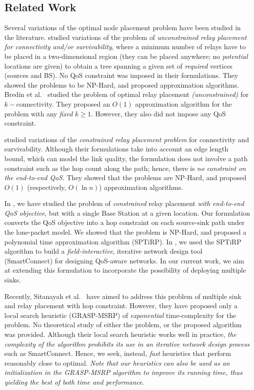 \documentclass[conference]{IEEEtran}
\begin{document}
\subsection{Related Work}
Several variations of the optimal node placement problem have been studied in the literature. \cite{Lin,cheng,Lloyd} studied variations of the problem of \emph{unconstrained relay placement for connectivity and/or survivability}, where a minimum number of relays have to be placed in a two-dimensional region (they can be placed anywhere; no \emph{potential} locations are given) to obtain a tree spanning a given set of \emph{required} vertices (sources and BS). No QoS constraint was imposed in their formulations. They showed the problems to be NP-Hard, and proposed approximation algorithms. Bredin et al.\ \cite{bredin} studied the problem of optimal relay placement \emph{(unconstrained)} for $k-$connectivity. They proposed an $O(1)$ approximation algorithm for the problem with any \emph{fixed} $k\geq 1$. However, they also did not impose any QoS constraint. 

\cite{Misra,yang} studied variations of the \emph{constrained relay placement problem} for connectivity and survivability. Although their formulations take into account an edge length bound, which can model the link quality, the formulation does not involve a path constraint such as the hop count along the path; hence, there is \emph{no constraint on the end-to-end QoS.} They showed that the problems are NP-Hard, and proposed $O(1)$ (respectively, $O(\ln n)$) approximation algorithms. 

In \cite{iwqos,fullpaper}, we have studied the problem of \emph{constrained} relay placement \emph{with end-to-end QoS objective}, but with a single Base Station at a given location. Our formulation converts the QoS objective into a hop constraint on each source-sink path under the lone-packet model. We showed that the problem is NP-Hard, and proposed a polynomial time approximation algorithm (SPTiRP). In \cite{smartconnect-paper}, we used the SPTiRP algorithm to build a  \emph{field-interactive}, iterative network design tool (SmartConnect) for designing QoS-aware networks. In our current work, we aim at extending this formulation to incorporate the possibility of deploying multiple sinks. 
  
Recently, Sitanayah et al.\ \cite{sitanayah} have aimed to address this problem of multiple sink and relay placement with hop constraint. However, they have proposed only a local search heuristic (GRASP-MSRP) of \emph{exponential} time-complexity for the problem. No theoretical study of either the problem, or the proposed algorithm was provided. Although their local search heuristic works well in practice, \emph{the complexity of the algorithm prohibits its use in an iterative network design process} such as SmartConnect\cite{smartconnect-paper}. Hence, we seek, instead, \emph{fast} heuristics that perform reasonably close to optimal. \emph{Note that our heuristics can also be used as an initialization in the GRASP-MSRP algorithm \cite{sitanayah} to improve its running time, thus yielding the best of both time and performance}.
\end{document}
